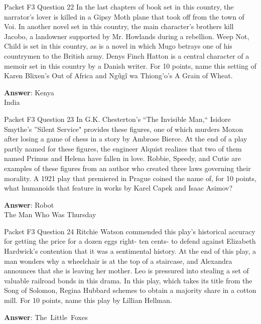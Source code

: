 \begin{frame}{Packet F3 Question 22}
In the last chapters of book set in this country, the narrator’s lover is killed in a Gipsy Moth plane that took off from the town of Voi. In another novel set in this country, the main character’s brothers kill Jacobo, a landowner supported by Mr. Howlands during a rebellion. Weep Not, Child is set in this country, as is a novel in which Mugo betrays one of his countrymen to the   British army. Denys Finch Hatton is a central   character of a memoir set in this country by a Danish writer. For 10 points, name this setting of Karen Blixen’s Out of Africa and Ngũgĩ wa Thiong’o’s A   Grain of Wheat.  

\textbf{Answer}: Kenya\\
 India
\end{frame}

\begin{frame}{Packet F3 Question 23}
In G.K. Chesterton’s “The   Invisible Man,`` Isidore Smythe’s ''Silent Service" provides these figures, one of which murders Moxon after losing a game of chess in a story by Ambrose Bierce. At the end of a play partly named for these figures, the   engineer Alquist realizes that two of them named Primus and Helena have fallen     in love. Robbie, Speedy, and Cutie are examples of these figures from an author who created three laws governing their morality. A 1921 play that premiered in Prague coined the name of, for 10 points, what humanoids that feature in works by Karel Capek and Isaac   Asimov?

\textbf{Answer}: Robot\\
 The Man Who Was Thursday
\end{frame}

\begin{frame}{Packet F3 Question 24}
Ritchie Watson commended this play's historical accuracy for getting the price for a dozen eggs right- ten cents- to defend against Elizabeth Hardwick’s contention that it was a sentimental history. At the end of this play, a man wonders why a wheelchair is at the top of a staircase, and Alexandra announces that she is leaving her mother. Leo is pressured into stealing a set of valuable railroad bonds in this drama. In this play, which takes its title from the Song of Solomon, Regina Hubbard schemes     to obtain a majority share in a cotton mill. For 10 points,     name this play by Lillian Hellman.

\textbf{Answer}: The\ Little\ Foxes\\
\end{frame}

